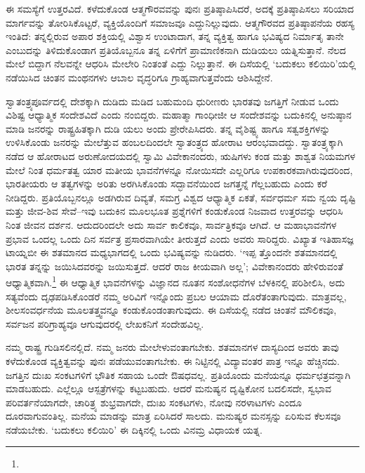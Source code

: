 ಈ ಸಮಸ್ಯೆಗೆ ಉತ್ತರವಿದೆ. ಕಳೆದುಕೊಂಡ ಆತ್ಮಗೌರವವನ್ನು ಪುನಃ ಪ್ರತಿಷ್ಠಾಪಿಸಿದರೆ, ಅದಕ್ಕೆ ಪ್ರತಿಷ್ಠಾಪಿಸಲು ಸರಿಯಾದ ಮಾರ್ಗವನ್ನು ತೋರಿಸಿಕೊಟ್ಟರೆ, ವ್ಯಕ್ತಿಯೊಂದಿಗೆ ಸಮಾಜವೂ ಎದ್ದುನಿಲ್ಲುವುದು. ಆತ್ಮಗೌರವದ ಪ್ರತಿಷ್ಠಾಪನೆಯ ರಹಸ್ಯ ಇಂತಿದೆ: ತನ್ನಲ್ಲಿರುವ ಅಪಾರ ಶಕ್ತಿಯಲ್ಲಿ ವಿಶ್ವಾಸ ಉಂಟಾದಾಗ, ತನ್ನ ವ್ಯಕ್ತಿತ್ವ ಹಾಗೂ ಭವಿಷ್ಯದ ನಿರ್ಮಾತೃ ತಾನೇ ಎಂಬುದನ್ನು ತಿಳಿದುಕೊಂಡಾಗ ಪ್ರತಿಯೊಬ್ಬನೂ ತನ್ನ ಏಳಿಗೆಗೆ ಪ್ರಾಮಾಣಿಕನಾಗಿ ದುಡಿಯಲು ಯತ್ನಿಸುತ್ತಾನೆ. ನೆಲದ ಮೇಲೆ ಬಿದ್ದಾಗ ನೆಲವನ್ನೇ ಆಧರಿಸಿ ಮೇಲೇರಿ ನಿಂತಂತೆ ಎದ್ದು ನಿಲ್ಲುತ್ತಾನೆ. ಈ ದಿಸೆಯಲ್ಲಿ ‘ಬದುಕಲು ಕಲಿಯಿರಿ’ಯಲ್ಲಿ ನಡೆಯಿಸಿದ ಚಿಂತನ ಮಂಥನಗಳು ಆಬಾಲ ವೃದ್ಧರಿಗೂ ಗ್ರಾಹ್ಯವಾಗುತ್ತವೆಂದು ಆಶಿಸಿದ್ದೇನೆ.

ಸ್ವಾತಂತ್ರ್ಯಪೂರ್ವದಲ್ಲಿ ದೇಶಕ್ಕಾಗಿ ದುಡಿದು ಮಡಿದ ಬಹುಮಂದಿ ಧುರೀಣರು ಭಾರತವು ಜಗತ್ತಿಗೆ ನೀಡುವ ಒಂದು ವಿಶಿಷ್ಟ ಆಧ್ಯಾತ್ಮಿಕ ಸಂದೇಶವಿದೆ ಎಂದು ನಂಬಿದ್ದರು. ಮಹಾತ್ಮಾ ಗಾಂಧೀಜೀ ಆ ಸಂದೇಶವನ್ನು ಬದುಕಿನಲ್ಲಿ ಅನುಷ್ಠಾನ ಮಾಡಿ ಜನರನ್ನು ರಾಷ್ಟ್ರಹಿತಕ್ಕಾಗಿ ದುಡಿ ಯಲು ಅಂದು ಪ್ರೇರೇಪಿಸಿದರು. ತನ್ನ ವೈಶಿಷ್ಟ್ಯ ಹಾಗೂ ಸತ್ವಶಕ್ತಿಗಳನ್ನು ಉಳಿಸಿಕೊಂಡು ಜನರನ್ನು ಮೇಲೆತ್ತುವ ಹಂಬಲದಿಂದಲೇ ಸ್ವಾತಂತ್ರ್ಯದ ಹೋರಾಟ ಆರಂಭವಾದದ್ದು. ಸ್ವಾತಂತ್ರ್ಯಕ್ಕಾಗಿ ನಡೆದ ಆ ಹೋರಾಟದ ಅರುಣೋದಯದಲ್ಲಿ ಸ್ವಾಮಿ ವಿವೇಕಾನಂದರು, ಋಷಿಗಳು ಕಂಡ ಮತ್ತು ಶಾಶ್ವತ ನಿಯಮಗಳ ಮೇಲೆ ನಿಂತ ಧರ್ಮತತ್ವ ಯಾರ ಮತೀಯ ಭಾವನೆಗಳನ್ನೂ ನೋಯಿಸದೇ ಎಲ್ಲರಿಗೂ ಉಪಕಾರಕವಾಗಿರುವುದರಿಂದ, ಭಾರತೀಯರು ಆ ತತ್ವಗಳನ್ನು ಅರಿತು ಅರಗಿಸಿಕೊಂಡು ಸದ್ಭಾವನೆಯಿಂದ ಜಗತ್ತನ್ನೆ ಗೆಲ್ಲಬಹುದು ಎಂದು ಕರೆ ನೀಡಿದ್ದರು. ಪ್ರತಿಯೊಬ್ಬನಲ್ಲೂ ಅಡಗಿರುವ ದಿವ್ಯತೆ, ಸಮಗ್ರ ವಿಶ್ವದ ಆಧ್ಯಾತ್ಮಿಕ ಏಕತೆ, ಸರ್ವಧರ್ಮ ಸಮ ನ್ವಯ ದೃಷ್ಟಿ ಮತ್ತು ಜೀವ-ಶಿವ ಸೇವೆ–ಇವು ಬದುಕಿನ ಮೂಲಭೂತ ಪ್ರಶ್ನೆಗಳಿಗೆ ಕಂಡುಕೊಂಡ ನಿಜವಾದ ಉತ್ತರವನ್ನು ಆಧರಿಸಿ ನಿಂತ ಜೀವನ ದರ್ಶನ. ಆದುದರಿಂದಲೇ ಅದು ಸಾರ್ವ ಕಾಲಿಕವೂ, ಸಾರ್ವತ್ರಿಕವೂ ಆಗಿದೆ. ಆ ಮಹಾಭಾವನೆಗಳ ಪ್ರಭಾವ ಒಂದಲ್ಲ ಒಂದು ದಿನ ಸರ್ವತ್ರ ಪ್ರಸಾರವಾಗಿಯೇ ತೀರುತ್ತದೆ ಎಂದು ಅವರು ಸಾರಿದ್ದರು. ವಿಖ್ಯಾತ ಇತಿಹಾಸಜ್ಞ ಟಾಯ್ನಬೀ ಈ ಶತಮಾನದ ಮಧ್ಯಭಾಗದಲ್ಲಿ ಒಂದು ಭವಿಷ್ಯವನ್ನು ನುಡಿದರು. ‘ಇಪ್ಪ ತ್ತೊಂದನೇ ಶತಮಾನದಲ್ಲಿ ಭಾರತ ತನ್ನನ್ನು ಜಯಿಸಿದವರನ್ನು ಜಯಿಸುತ್ತದೆ. ಆದರೆ ರಾಜ ಕೀಯವಾಗಿ ಅಲ್ಲ’; ವಿವೇಕಾನಂದರು ಹೇಳಿರುವಂತೆ ಆಧ್ಯಾತ್ಮಿಕವಾಗಿ.\footnote{\hfill{}} ಈ ಆಧ್ಯಾತ್ಮಿಕ ಭಾವನೆಗಳನ್ನು ವಿಜ್ಞಾನದ ನೂತನ ಸಂಶೋಧನೆಗಳ ಬೆಳಕಿನಲ್ಲಿ ಪರಿಶೀಲಿಸಿ, ಅದು ಸತ್ಯವೆಂದು ದೃಢಪಡಿಸಿಕೊಂಡರೆ ನಮ್ಮ ಅರಿವಿಗೆ ಇನ್ನೊಂದು ಪ್ರಬಲ ಆಯಾಮ ದೊರೆತಂತಾಗುವುದು. ಮಾತ್ರವಲ್ಲ, ಶೀಲಸಂವರ್ಧನೆಯ ಮೂಲತತ್ತ್ವವನ್ನೂ ಕಂಡುಕೊಂಡಂತಾಗುವುದು. ಈ ದಿಸೆಯಲ್ಲಿ ನಡೆದ ಚಿಂತನೆ ಮೌಲಿಕವೂ, ಸರ್ವಜನ ಪರಿಗ್ರಾಹ್ಯವೂ ಆಗುವುದರಲ್ಲಿ ಲೇಖಕನಿಗೆ ಸಂದೇಹವಿಲ್ಲ.

ನಮ್ಮ ರಾಷ್ಟ್ರ ಗುಡಿಸಲಿನಲ್ಲಿದೆ. ನಮ್ಮ ಜನರು ಮೇಲೇಳುವಂತಾಗಬೇಕು. ಶತಮಾನಗಳ ದಾಸ್ಯದಿಂದ ಅವರು ತಾವು ಕಳೆದುಕೊಂಡ ವ್ಯಕ್ತಿತ್ವವನ್ನು ಪುನಃ ಪಡೆಯುವಂತಾಗಬೇಕು. ಈ ನಿಟ್ಟಿನಲ್ಲಿ ವಿದ್ಯಾವಂತರ ಪಾತ್ರ ಇನ್ನೂ ಹೆಚ್ಚಿನದು. ಜಗತ್ತಿನ ದುಃಖ ಸಂಕಟಗಳಿಗೆ ಭೌತಿಕ ಸಹಾಯ ಒಂದೇ ಔಷಧವಲ್ಲ. ಪ್ರತಿಯೊಂದು ಮನೆಯನ್ನೂ ಧರ್ಮಛತ್ರವನ್ನಾಗಿ ಮಾಡಬಹುದು. ಎಲ್ಲೆಲ್ಲೂ ಆಸ್ಪತ್ರೆಗಳನ್ನು ಕಟ್ಟಬಹುದು. ಆದರೆ ಮನುಷ್ಯನ ದೃಷ್ಟಿಕೋನ ಬದಲಿಸದೇ, ಸ್ವಭಾವ ಪರಿವರ್ತನೆಯಾಗದೇ, ಚಾರಿತ್ರ್ಯ ಶುಭ್ರವಾಗದೇ, ದುಃಖ ಸಂಕಟಗಳು, ನೋವು ನರಳಾಟಗಳು ಎಂದೂ ದೂರವಾಗುವಂತಿಲ್ಲ. ಮನೆಯ ಮಾಡನ್ನು ಮಾತ್ರ ಏರಿಸಿದರೆ ಸಾಲದು. ಮನುಷ್ಯರ ಮನಸ್ಸನ್ನು ಏರಿಸುವ ಕೆಲಸವೂ ನಡೆಯಬೇಕು. ‘ಬದುಕಲು ಕಲಿಯಿರಿ’ ಈ ದಿಕ್ಕಿನಲ್ಲಿ ಒಂದು ವಿನಮ್ರ ವಿಧಾಯಕ ಯತ್ನ.

